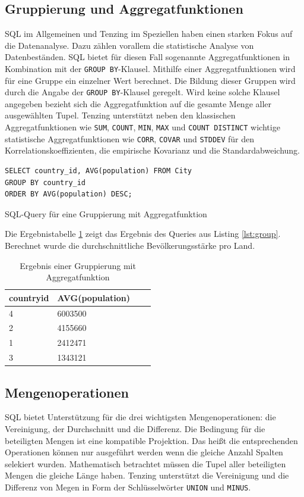 \documentclass[a4paper]{article}
\begin{document}
\subsection{Gruppierung und Aggregatfunktionen}
SQL im Allgemeinen und Tenzing im Speziellen haben einen starken Fokus auf die Datenanalyse. Dazu zählen vorallem die statistische Analyse von Datenbeständen. SQL bietet für diesen Fall sogenannte Aggregatfunktionen in Kombination mit der \texttt{GROUP BY}-Klausel. Mithilfe einer Aggregatfunktionen wird für eine Gruppe ein einzelner Wert berechnet. Die Bildung dieser Gruppen wird durch die Angabe der \texttt{GROUP BY}-Klausel geregelt. Wird keine solche Klausel angegeben bezieht sich die Aggregatfunktion auf die gesamte Menge aller ausgewählten Tupel. Tenzing unterstützt neben den klassischen Aggregatfunktionen wie \texttt{SUM}, \texttt{COUNT}, \texttt{MIN}, \texttt{MAX} und \texttt{COUNT DISTINCT} wichtige statistische Aggregatfunktionen wie \texttt{CORR}, \texttt{COVAR} und \texttt{STDDEV} für den Korrelationskoeffizienten, die empirische Kovarianz und die Standardabweichung.

\begin{listing}[H]
\begin{verbatim}
SELECT country_id, AVG(population) FROM City 
GROUP BY country_id 
ORDER BY AVG(population) DESC;
\end{verbatim}
\caption{SQL-Query für eine Gruppierung mit Aggregatfunktion}
\label{lst:group}
\end{listing}

Die Ergebnistabelle \ref{tab:group} zeigt das Ergebnis des Queries aus Listing \ref{lst:group}. Berechnet wurde die durchschnittliche Bevölkerungsstärke pro Land.

\begin{table}[H]
\centering
  \begin{tabular}{| l | l | l | l |}
    \hline
     country\protect{\textunderscore}id & AVG(population) \\ \hline
    \hline
    4 & 6003500 \\ \hline
    2 & 4155660 \\ \hline
    1 & 2412471 \\ \hline
    3 & 1343121 \\ \hline
  \end{tabular}
\caption{Ergebnis einer Gruppierung mit Aggregatfunktion}
\label{tab:group}
\end{table}

\newpage
\subsection{Mengenoperationen}
SQL bietet Unterstützung für die drei wichtigsten Mengenoperationen: die Vereinigung, der Durchschnitt und die Differenz. Die Bedingung für die beteiligten Mengen ist eine kompatible Projektion. Das heißt die entsprechenden Operationen können nur ausgeführt werden wenn die gleiche Anzahl Spalten selekiert wurden. Mathematisch betrachtet müssen die Tupel aller beteiligten Mengen die gleiche Länge haben. Tenzing unterstützt die Vereinigung und die Differenz von Megen in Form der Schlüsselwörter \texttt{UNION} und \texttt{MINUS}.
\end{document}
